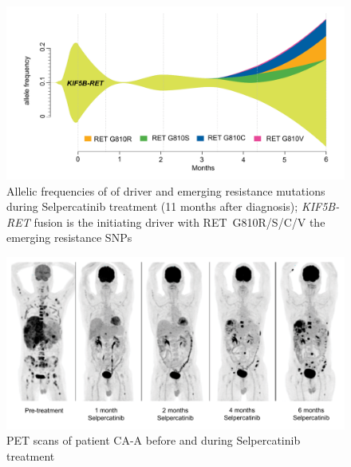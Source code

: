 \begin{figure}[ht]
\centering
\includegraphics[width=.99\linewidth]{Figures/CASCADE/CA99/CA-A_ctDNAstream}
\caption[Allelic frequencies of of driver and emerging resistance mutations]{Allelic frequencies of of driver and emerging resistance mutations during Selpercatinib treatment (11 months after diagnosis); \textit{KIF5B-RET} fusion is the initiating driver with RET~G810R/S/C/V the emerging resistance SNPs} \label{fig:ca99ctDNA}
\end{figure}


\begin{figure}[ht]
\centering
\includegraphics[width=.99\linewidth]{Figures/CASCADE/CA99/CA-A_PETscans}
\caption[PET scans of patient CA-A before and during Selpercatinib treatment]{PET scans of patient CA-A before and during Selpercatinib treatment} \label{fig:ca99pet}
\end{figure}


